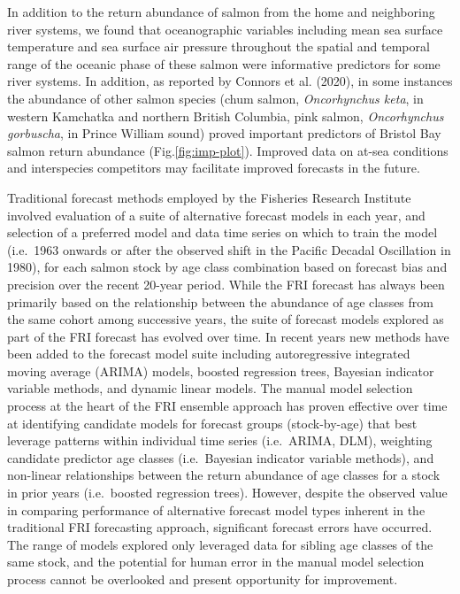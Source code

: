 \documentclass[
]{article}
\begin{document}
In addition to the return abundance of salmon from the home and neighboring river systems, we found that oceanographic variables including mean sea surface temperature and sea surface air pressure throughout the spatial and temporal range of the oceanic phase of these salmon were informative predictors for some river systems. In addition, as reported by Connors et al. (2020), in some instances the abundance of other salmon species (chum salmon, \emph{Oncorhynchus keta}, in western Kamchatka and northern British Columbia, pink salmon, \emph{Oncorhynchus gorbuscha}, in Prince William sound) proved important predictors of Bristol Bay salmon return abundance (Fig.\ref{fig:imp-plot}). Improved data on at-sea conditions and interspecies competitors may facilitate improved forecasts in the future.

Traditional forecast methods employed by the Fisheries Research Institute involved evaluation of a suite of alternative forecast models in each year, and selection of a preferred model and data time series on which to train the model (i.e.~1963 onwards or after the observed shift in the Pacific Decadal Oscillation in 1980), for each salmon stock by age class combination based on forecast bias and precision over the recent 20-year period. While the FRI forecast has always been primarily based on the relationship between the abundance of age classes from the same cohort among successive years, the suite of forecast models explored as part of the FRI forecast has evolved over time. In recent years new methods have been added to the forecast model suite including autoregressive integrated moving average (ARIMA) models, boosted regression trees, Bayesian indicator variable methods, and dynamic linear models. The manual model selection process at the heart of the FRI ensemble approach has proven effective over time at identifying candidate models for forecast groups (stock-by-age) that best leverage patterns within individual time series (i.e.~ARIMA, DLM), weighting candidate predictor age classes (i.e.~Bayesian indicator variable methods), and non-linear relationships between the return abundance of age classes for a stock in prior years (i.e.~boosted regression trees). However, despite the observed value in comparing performance of alternative forecast model types inherent in the traditional FRI forecasting approach, significant forecast errors have occurred. The range of models explored only leveraged data for sibling age classes of the same stock, and the potential for human error in the manual model selection process cannot be overlooked and present opportunity for improvement.
\end{document}
